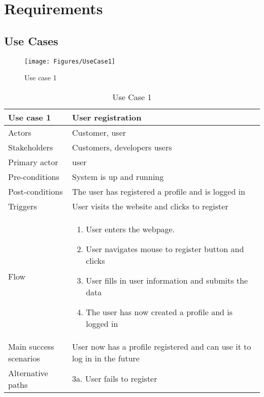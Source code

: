 \chapter{Requirements}


\section{Use Cases}

\begin{figure}[H]
\centering
\texttt{[image: Figures/UseCase1]}
\caption{Use case 1}
    \label{fig:UC1}
    \end{figure}

\begin{table}[H]
\begin{tabular}{ | L{0.25\linewidth} | L{0.75\linewidth} | } 
 \hline {}
 Use case 1 & User registration  \\ 
 \hline
 Actors & Customer, user \\ 
 \hline
 Stakeholders & Customers, developers users \\ 
  \hline
 Primary actor & user  \\ 
 \hline
 Pre-conditions & System is up and running \\ 
 \hline
 Post-conditions & The user has registered a profile and is logged in \\ 
  \hline
 Triggers & User visits the website and clicks to register \\ 
 \hline
Flow &
\vspace{-5mm}
    \begin{enumerate}[noitemsep]
  \item User enters the webpage.
  \item User navigates mouse to register button and clicks
  \item User fills in user information and submits the data
  \item The user has now created a profile and is logged in
   \end{enumerate}\\ 
 \hline
 Main success scenarios & User now has a profile registered and can use it to log in in the future \\ 
 \hline
 Alternative paths & 3a. User fails to register\\
 \hline
\end{tabular}
\caption{Use Case 1}
\end{table}

